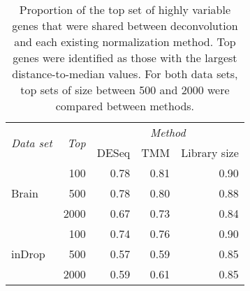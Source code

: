 \documentclass{article}
\begin{document}
\begin{table}[p]
    \caption{ 
        Proportion of the top set of highly variable genes that were shared between deconvolution and each existing normalization method.
        Top genes were identified as those with the largest distance-to-median values. 
        For both data sets, top sets of size between 500 and 2000 were compared between methods.
    }
    \begin{center}
        \begin{tabular}{l r r r r}
            \hline
            \multirow{2}{*}{\textit{Data set}} & \multirow{2}{*}{\textit{Top}} & \multicolumn{3}{c}{\textit{Method}} \\
                \cline{3-5}
                & & DESeq & TMM & Library size \\
            \hline
            \multirow{3}{*}{Brain}            
            & 100  & 0.78 & 0.81 & 0.90 \\ 
            & 500  & 0.78 & 0.80 & 0.88 \\
            & 2000 & 0.67 & 0.73 & 0.84 \\
            \hline
            \multirow{3}{*}{inDrop}            
            & 100  & 0.74 & 0.76 & 0.90 \\ 
            & 500  & 0.57 & 0.59 & 0.85 \\
            & 2000 & 0.59 & 0.61 & 0.85 \\
            \hline
        \end{tabular}
    \end{center}
\end{table}
\end{document}
